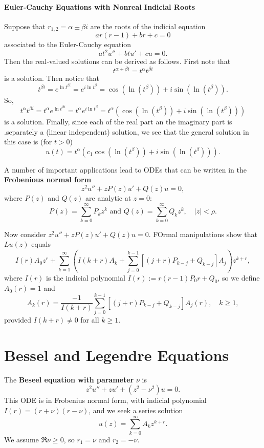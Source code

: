 
\paragraph{Euler-Cauchy Equations with Nonreal Indicial Roots}
Suppose that \(r_{1,2} = \alpha \pm \beta i\) are the roots of the indicial equation
\[ar(r - 1) + br + c = 0\]
associated to the Euler-Cauchy equation
\[at^2u'' + btu' + cu = 0.\]
Then the real-valued solutions can be derived as follows. First note that
\[t^{\alpha + \beta i} = t^\alpha t^{\beta i}\]
is a solution. Then notice that
\[t^{\beta i} = e^{\ln t^{\beta i}} = e^{i \ln t^\beta} = \cos(\ln(t^\beta)) + i\sin(\ln(t^\beta)).\]
So,
\[t^\alpha t^{\beta i} = t^{\alpha} e^{\ln t^{\beta i}} = t^\alpha e^{i \ln t^\beta} = t^\alpha \left(\cos(\ln(t^\beta)) + i\sin(\ln(t^\beta))\right)\]
is a solution. Finally, since each of the real part an the imaginary part is .separately a (linear independent) solution, we see that the general solution in this case is (for \(t > 0\))
\[u(t) = t^{\alpha}\left(c_1 \cos(\ln(t^\beta)) + i\sin(\ln(t^\beta))\right).\]


\bigskip
A number of important applications lead to ODEs that can be written in the \textbf{Frobenious normal form}
\[z^2u'' + zP(z)u' + Q(z)u = 0,\]
where \(P(z)\) and \(Q(z)\) are analytic at \(z = 0\):
\[P(z) = \sum_{k=0}^{\infty}P_k z^k \text{ and } Q(z) = \sum_{k=0}^{\infty}Q_k z^k, \quad |z| < \rho.\]

Now consider \(z^2u'' + zP(z) u' + Q(z)u = 0\). FOrmal manipulations show that \(Lu(z)\) equals
\[I(r)A_0 z^r + \sum_{k=1}^{\infty}\left(I(k + r) A_k + \sum_{j=0}^{k-1} \left[(j + r)P_{k - j} + Q_{k - j} \right]A_j \right)z^{k + r},\]
where \(I(r)\) is the indicial polynomial \(I(r) := r(r - 1)P_0 r + Q_0\), so we define \(A_0(r) = 1\) and
\[A_k(r) = \frac{-1}{I(k + r)} \sum_{j=0}^{k-1}[(j + r)P_{k-j} + Q_{k - j}]A_j(r), \quad k \geq 1,\]
provided \(I(k + r) \neq 0\) for all \(k \geq 1\).

\section{Bessel and Legendre Equations}
The \textbf{Beseel equation with parameter} \(\nu\) is
\[z^2u'' + zu' + (z^2 - \nu^2)u = 0.\]
This ODE is in Frobenius normal form, with indicial polynomial \(I(r) = (r + \nu)(r - \nu)\),
and we seek a series solution
\[u(z) = \sum_{k=0}^{\infty} A_k z^{k + r}.\]
We assume \(\Re \nu \geq 0\), so \(r_1 = \nu\) and \(r_2 = -\nu\).